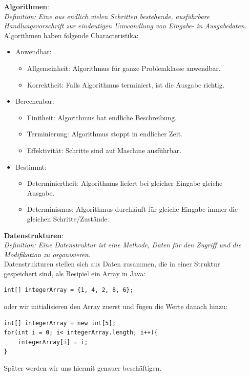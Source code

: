 \documentclass{article}
\begin{document}
            \textbf{Algorithmen}: \\
            \textit{Definition: Eine aus endlich vielen Schritten bestehende, ausführbare Handlungsvorschrift zur eindeutigen Umwandlung von Eingabe- in Ausgabedaten.} \\
            Algorithmen haben folgende Characteristika: 
            \begin{itemize}
                \item Anwendbar:
                \begin{itemize}
                    \item Allgemeinheit: Algorithmus für ganze Problemklasse anwendbar.
                    \item Korrektheit: Falls Algorithmus terminiert, ist die Ausgabe richtig.
                \end{itemize}
                \item Berechenbar:
                \begin{itemize}
                    \item Finitheit: Algorithmus hat endliche Beschreibung.
                    \item Terminierung: Algorithmus stoppt in endlicher Zeit.
                    \item Effektivität: Schritte sind auf Maschine ausführbar.
                \end{itemize}
                \item Bestimmt:
                \begin{itemize}
                    \item Determiniertheit: Algorithmus liefert bei gleicher Eingabe gleiche Ausgabe.
                    \item Determinismus: Algorithmus durchläuft für gleiche Eingabe immer die gleichen Schritte/Zustände.
                \end{itemize}
            \end{itemize}

            \textbf{Datenstrukturen}: \\
            \textit{Definition: Eine Datenstruktur ist eine Methode, Daten für den Zugriff und die Modifikation zu organisieren.} \\
            Datenstrukturen stellen sich aus Daten zusammen, die in einer Struktur gespeichert sind, als Besipiel ein Array in Java: \\
            \begin{lstlisting}[style=JavaStyle]
int[] integerArray = {1, 4, 2, 8, 6};
            \end{lstlisting}
            oder wir initialisieren den Array zuerst und fügen die Werte danach hinzu:
            \begin{lstlisting}[style=JavaStyle]
int[] integerArray = new int[5];
for(int i = 0; i< integerArray.length; i++){
    integerArray[i] = i;
}
            \end{lstlisting}
            Später werden wir uns hiermit genauer beschäftigen.
\end{document}
